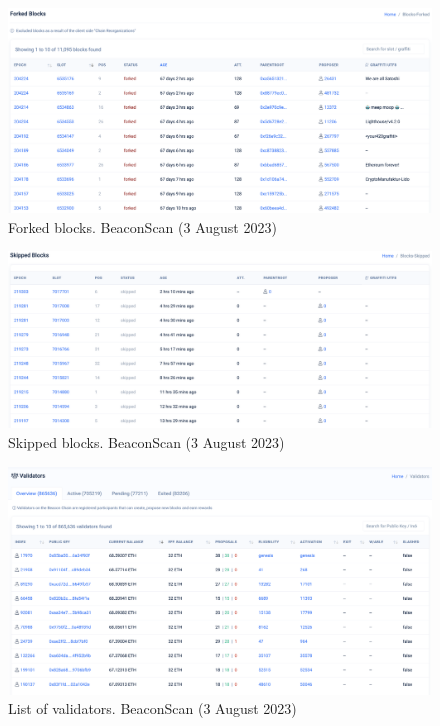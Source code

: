 \documentclass[UTF8]{article}
\begin{document}
{\begin{figure}[htbp]
\begin{center}
\includegraphics[width=\linewidth]{images/beaconscan2}
\caption{Forked blocks. BeaconScan (3 August 2023)}
\label{fig:beaconscan2}
\end{center}
\end{figure}

\begin{figure}[htbp]
\begin{center}
\includegraphics[width=\linewidth]{images/beaconscan3}
\caption{Skipped blocks. BeaconScan (3 August 2023)}
\label{fig:beaconscan3}
\end{center}
\end{figure}

\begin{figure}[htbp]
\begin{center}
\includegraphics[width=\linewidth]{images/beaconscan4}
\caption{List of validators. BeaconScan (3 August 2023)}
\label{fig:beaconscan4}
\end{center}
\end{figure}

}
\end{document}
